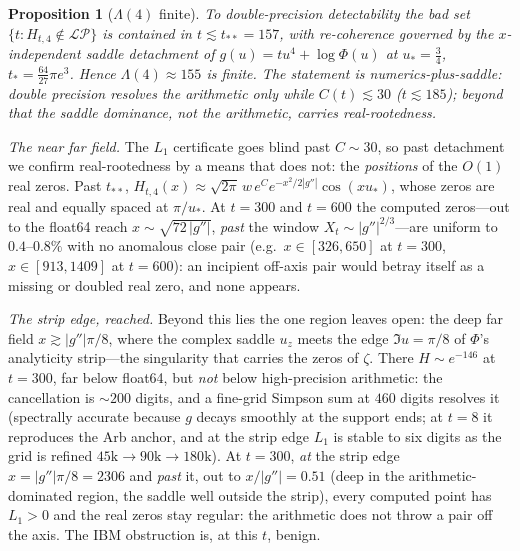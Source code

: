 \documentclass[11pt,reqno]{amsart}
\theoremstyle{plain}
\newtheorem{proposition}[theorem]{Proposition}
\theoremstyle{definition}
\theoremstyle{remark}
\newcommand{\LP}{\mathcal{LP}}
\begin{document}
\begin{proposition}[$\Lambda(4)$ finite]\label{prop:lam4finite}
To double-precision detectability the bad set $\{t:H_{t,4}\notin\LP\}$ is
contained in $t\lesssim t_{**}=157$, with re-coherence governed by the
$x$-independent saddle detachment of $g(u)=tu^4+\log\Phi(u)$ at
$u_*=\tfrac34$, $t_*=\tfrac{64}{27}\pi e^3$. Hence $\Lambda(4)\approx155$ is
finite. The statement is numerics-plus-saddle: double precision resolves
the arithmetic only while $C(t)\lesssim30$ ($t\lesssim185$); beyond that
the saddle dominance, not the arithmetic, carries real-rootedness.
\end{proposition}

\emph{The near far field.} The $L_1$ certificate goes blind past
$C\sim30$, so past detachment we confirm real-rootedness by a means that
does not: the \emph{positions} of the $O(1)$ real zeros. Past $t_{**}$,
$H_{t,4}(x)\approx \sqrt{2\pi}\,w\,e^{C}e^{-x^2/2|g''|}\cos(xu_*)$, whose
zeros are real and equally spaced at $\pi/u_*$. At $t=300$ and $t=600$ the
computed zeros---out to the float64 reach $x\sim\sqrt{72\,|g''|}$,
\emph{past} the window $X_t\sim|g''|^{2/3}$---are uniform to $0.4$--$0.8\%$
with no anomalous close pair (e.g.\ $x\in[326,650]$ at $t=300$,
$x\in[913,1409]$ at $t=600$): an incipient off-axis pair would betray
itself as a missing or doubled real zero, and none appears.

\emph{The strip edge, reached.} Beyond this lies the one region
\cite{FontesIBM} leaves open: the deep far field $x\gtrsim|g''|\pi/8$,
where the complex saddle $u_z$ meets the edge $\Im u=\pi/8$ of $\Phi$'s
analyticity strip---the singularity that carries the zeros of $\zeta$.
There $H\sim e^{-146}$ at $t=300$, far below float64, but \emph{not} below
high-precision arithmetic: the cancellation is $\sim200$ digits, and a
fine-grid Simpson sum at $460$ digits resolves it (spectrally accurate
because $g$ decays smoothly at the support ends; at $t=8$ it reproduces the
Arb anchor, and at the strip edge $L_1$ is stable to six digits as the grid
is refined $45\mathrm{k}\to90\mathrm{k}\to180\mathrm{k}$). At $t=300$, \emph{at}
the strip edge $x=|g''|\pi/8=2306$ and \emph{past} it, out to
$x/|g''|=0.51$ (deep in the arithmetic-dominated region, the saddle well
outside the strip), every computed point has $L_1>0$ and the real zeros
stay regular: the arithmetic does not throw a pair off the axis. The
IBM obstruction is, at this $t$, benign.
\end{document}
